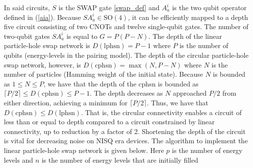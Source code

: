 \documentclass[10pt]{article}
\begin{document}
In said circuits, $S$ is the SWAP gate \ref{swap_def} and $A^i_a$ is the two qubit operator defined in (\ref{aia}). Because $SA^i_a \in \text{SO}(4)$, it can be efficiently mapped \cite{ref:kak} to a depth five circuit consisting of two CNOTs and twelve single-qubit gates. The number of two-qubit gates $SA^i_a$ is equal to $G=P(P-N)$. The depth of the linear particle-hole swap network is $D(\text{lphsn})=P-1$ where $P$ is the number of qubits (energy-levels in the pairing model). The depth of the circular particle-hole swap network, however, is $D(\text{cphsn})=\max(N,P-N)$ where $N$ is the number of particles (Hamming weight of the initial state). Because $N$ is bounded as $1\leq N\leq P$, we have that the depth of the cphsn is bounded as $\lceil P/2 \rceil \leq D(\text{cphsn})\leq P-1$. The depth decreases as $N$ approached $P/2$ from either direction, achieving a minimum for $\lceil P/2 \rceil$. Thus, we have that $D(\text{cphsn})\leq D(\text{lphsn})$. That is, the circular connectivity enables a circuit of less than or equal to depth compared to a circuit constrained by linear connectivity, up to reduction by a factor of 2. Shortening the depth of the circuit is vital for decreasing noise on NISQ era devices. The algorithm to implement the linear particle-hole swap network is given below. Here $p$ is the number of energy levels and $n$ is the number of energy levels that are initially filled
\end{document}
